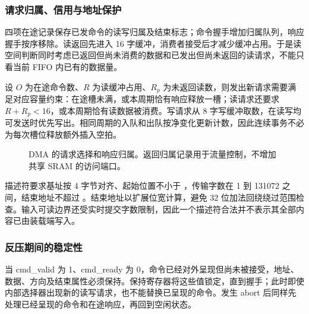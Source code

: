 \subsubsection{请求归属、信用与地址保护}
四项在途记录保存已发命令的读写归属及结束标志；命令握手增加归属队列，响应握手按序移除。读返回先进入 16 字缓冲，消费者接受后才减少缓冲占用。于是读空间判断同时考虑已返回但尚未消费的数据和已发出但尚未返回的读请求，不能只看当前 FIFO 内已有的数据量。

设 $O$ 为在途命令数、$R$ 为读缓冲占用、$R_p$ 为未返回读数，则发出新请求需要满足对应容量约束：在途槽未满，或本周期恰有响应释放一槽；读请求还要求 $R+R_p<16$，或本周期恰有读数据被消费。写请求从 8 字写缓冲取数，在读写均可发送时优先写出。相同周期的入队和出队按净变化更新计数，因此连续事务不必为每次槽位释放额外插入空拍。

\begin{figure}[H]\centering
{}
\caption{DMA 的请求选择和响应归属。返回归属记录用于流量控制，不增加共享 SRAM 的访问端口。}
\end{figure}

描述符要求基址按 4 字节对齐、起始位置不小于 ，传输字数在 1 到 131072 之间，结束地址不超过 。结束地址以扩展位宽计算，避免 32 位加法回绕绕过范围检查。输入可读边界还受实时提交字数限制，因此一个描述符合法并不表示其全部内容已由装载端写入。

\subsubsection{反压期间的稳定性}
当 cmd\_valid 为 1、cmd\_ready 为 0，命令已经对外呈现但尚未被接受，地址、数据、方向及结束属性必须保持。保持寄存器将这些值锁定，直到握手；此时即使内部选择器出现新的读写请求，也不能替换已呈现的命令。发生 abort 后同样先处理已经呈现的命令和在途响应，再回到空闲状态。

